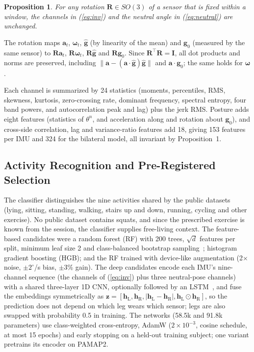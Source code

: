 \documentclass[conference]{IEEEtran}
\newcommand{\vect}[1]{\mathbf{#1}}
\newtheorem{proposition}{Proposition}
\begin{document}
\begin{proposition}
For any rotation $\vect{R}\in SO(3)$ of a sensor that is fixed within a window, the channels in (\ref{eq:inv}) and the neutral angle in (\ref{eq:neutral}) are unchanged.
\end{proposition}
\begin{IEEEproof}
The rotation maps $\vect{a}_t$, $\boldsymbol{\omega}_t$, $\hat{\vect{g}}$ (by linearity of the mean) and $\vect{g}_0$ (measured by the same sensor) to $\vect{R}\vect{a}_t$, $\vect{R}\boldsymbol{\omega}_t$, $\vect{R}\hat{\vect{g}}$ and $\vect{R}\vect{g}_0$. Since $\vect{R}^{\top}\vect{R}=\vect{I}$, all dot products and norms are preserved, including $\lVert\vect{a}-(\vect{a}\cdot\hat{\vect{g}})\hat{\vect{g}}\rVert$ and $\vect{a}\cdot\vect{g}_0$; the same holds for $\boldsymbol{\omega}$.
\end{IEEEproof}

Each channel is summarized by 24 statistics (moments, percentiles, RMS, skewness, kurtosis, zero-crossing rate, dominant frequency, spectral entropy, four band powers, and autocorrelation peak and lag) plus the jerk RMS. Posture adds eight features (statistics of $\theta^{n}$, and acceleration along and rotation about $\vect{g}_0$), and cross-side correlation, lag and variance-ratio features add 18, giving 153 features per IMU and 324 for the bilateral model, all invariant by Proposition~1.

\subsection{Activity Recognition and Pre-Registered Selection}
The classifier distinguishes the nine activities shared by the public datasets (lying, sitting, standing, walking, stairs up and down, running, cycling and other exercise). No public dataset contains squats, and since the prescribed exercise is known from the session, the classifier supplies free-living context. The feature-based candidates were a random forest (RF) with 200 trees, $\sqrt{d}$ features per split, minimum leaf size 2 and class-balanced bootstrap sampling~\cite{breiman2001,pedregosa2011}; histogram gradient boosting (HGB); and the RF trained with device-like augmentation (2$\times$ noise, $\pm2^\circ$/s bias, $\pm3$\% gain). The deep candidates encode each IMU's nine-channel sequence (the channels of (\ref{eq:inv}) plus three neutral-pose channels) with a shared three-layer 1D CNN, optionally followed by an LSTM~\cite{ordonez2016}, and fuse the embeddings symmetrically as $\vect{z}=[\vect{h}_{\mathrm{L}},\vect{h}_{\mathrm{R}},\lvert\vect{h}_{\mathrm{L}}-\vect{h}_{\mathrm{R}}\rvert,\vect{h}_{\mathrm{L}}\odot\vect{h}_{\mathrm{R}}]$, so the prediction does not depend on which leg wears which sensor; legs are also swapped with probability 0.5 in training. The networks (58.5k and 91.8k parameters) use class-weighted cross-entropy, AdamW ($2\times10^{-3}$, cosine schedule, at most 15 epochs) and early stopping on a held-out training subject; one variant pretrains its encoder on PAMAP2.
\end{document}
